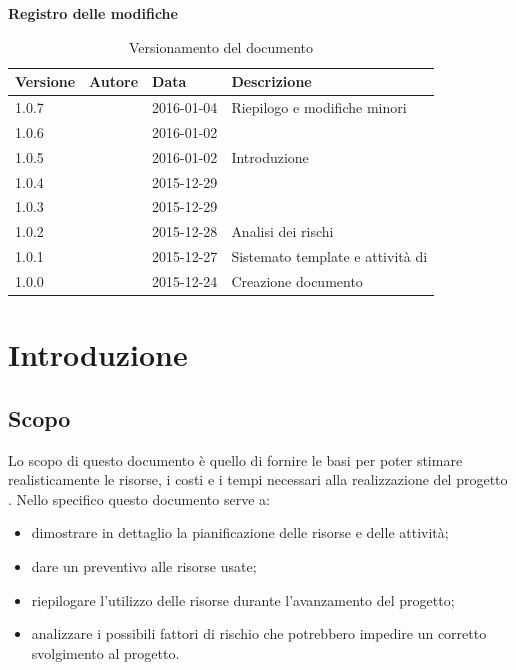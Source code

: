 \documentclass[12pt,a4paper]{article}
\begin{document}
\Large{\textbf{Registro delle modifiche}}\\
\normalsize

\begin{table}[H]
\begin{center}

\begin{tabular}{p{} p{} p{} p{}}
	\toprule
	\textbf{Versione}	&	\textbf{Autore}	&	\textbf{Data}	&	\textbf{Descrizione}\\
	\midrule
	\midrule
	1.0.7 & \NDC & 2016-01-04 &  Riepilogo e modifiche minori \\
	\midrule
	1.0.6 & \WS & 2016-01-02 &  \FVV \\
	\midrule
	1.0.5 & \WS & 2016-01-02 &  Introduzione \\
	\midrule
	1.0.4 & \TP & 2015-12-29 &  \FPDC \\
	\midrule
	1.0.3 & \TP & 2015-12-29 &  \FPA \\
	\midrule
	1.0.2 & \NDC & 2015-12-28 &  Analisi dei rischi \\
	\midrule
	1.0.1 & \NDC & 2015-12-27 &  Sistemato template e attività di \FA \\
	\midrule
	1.0.0 & \NDC & 2015-12-24 &  Creazione documento \\
	\bottomrule
\end{tabular}
\caption{Versionamento del documento}
\label{tabVers1}
\end{center}
\end{table}
\newpage

\tableofcontents
\newpage

\listoftables
\listoffigures
\newpage

\section{Introduzione} 

\subsection{Scopo}
Lo scopo di questo documento è quello di fornire le basi per poter stimare realisticamente le risorse, i costi e i tempi necessari alla realizzazione del progetto \prjL. Nello specifico questo documento serve a:
\begin{itemize}
	\item dimostrare in dettaglio la pianificazione delle risorse e delle attività;
	\item dare un preventivo alle risorse usate;
	\item riepilogare l'utilizzo delle risorse durante l'avanzamento del progetto;
	\item analizzare i possibili fattori di rischio che potrebbero impedire un corretto svolgimento al progetto.
\end{itemize}
\end{document}
